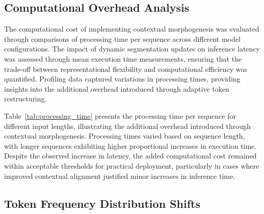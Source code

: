 \documentclass{article}
\begin{document}
\subsection{Computational Overhead Analysis}

The computational cost of implementing contextual morphogenesis was evaluated through comparisons of processing time per sequence across different model configurations. The impact of dynamic segmentation updates on inference latency was assessed through mean execution time measurements, ensuring that the trade-off between representational flexibility and computational efficiency was quantified. Profiling data captured variations in processing times, providing insights into the additional overhead introduced through adaptive token restructuring.

\begin{table}[t]
	\centering
	\caption{Processing Time per Sequence (Milliseconds)}
	\label{tab:processing_time}
	\renewcommand{\arraystretch}{1.3}
	\setlength{\arrayrulewidth}{0.5mm}
	\setlength{\tabcolsep}{8pt}
\end{table}

Table~\ref{tab:processing_time} presents the processing time per sequence for different input lengths, illustrating the additional overhead introduced through contextual morphogenesis. Processing times varied based on sequence length, with longer sequences exhibiting higher proportional increases in execution time. Despite the observed increase in latency, the added computational cost remained within acceptable thresholds for practical deployment, particularly in cases where improved contextual alignment justified minor increases in inference time.

\subsection{Token Frequency Distribution Shifts}
\end{document}
